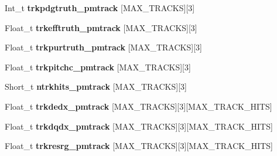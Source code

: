 \begin{DoxyCompactItemize}
\item 
\hypertarget{classanatree_a4039f571e1c27da177332399f30633b5}{Int\-\_\-t {\bfseries trkpdgtruth\-\_\-pmtrack} \mbox{[}M\-A\-X\-\_\-\-T\-R\-A\-C\-K\-S\mbox{]}\mbox{[}3\mbox{]}}\label{classanatree_a4039f571e1c27da177332399f30633b5}

\item 
\hypertarget{classanatree_a99202f1b486359afbf859093f5ac605e}{Float\-\_\-t {\bfseries trkefftruth\-\_\-pmtrack} \mbox{[}M\-A\-X\-\_\-\-T\-R\-A\-C\-K\-S\mbox{]}\mbox{[}3\mbox{]}}\label{classanatree_a99202f1b486359afbf859093f5ac605e}

\item 
\hypertarget{classanatree_a47b12693af49f90dada374e0d0f9105f}{Float\-\_\-t {\bfseries trkpurtruth\-\_\-pmtrack} \mbox{[}M\-A\-X\-\_\-\-T\-R\-A\-C\-K\-S\mbox{]}\mbox{[}3\mbox{]}}\label{classanatree_a47b12693af49f90dada374e0d0f9105f}

\item 
\hypertarget{classanatree_aa842f0282de766208616772211b5e34f}{Float\-\_\-t {\bfseries trkpitchc\-\_\-pmtrack} \mbox{[}M\-A\-X\-\_\-\-T\-R\-A\-C\-K\-S\mbox{]}\mbox{[}3\mbox{]}}\label{classanatree_aa842f0282de766208616772211b5e34f}

\item 
\hypertarget{classanatree_ae637a1305dfcb662e4696778c24e6972}{Short\-\_\-t {\bfseries ntrkhits\-\_\-pmtrack} \mbox{[}M\-A\-X\-\_\-\-T\-R\-A\-C\-K\-S\mbox{]}\mbox{[}3\mbox{]}}\label{classanatree_ae637a1305dfcb662e4696778c24e6972}

\item 
\hypertarget{classanatree_ad7277a76b6bcb971d0a96943117954d6}{Float\-\_\-t {\bfseries trkdedx\-\_\-pmtrack} \mbox{[}M\-A\-X\-\_\-\-T\-R\-A\-C\-K\-S\mbox{]}\mbox{[}3\mbox{]}\mbox{[}M\-A\-X\-\_\-\-T\-R\-A\-C\-K\-\_\-\-H\-I\-T\-S\mbox{]}}\label{classanatree_ad7277a76b6bcb971d0a96943117954d6}

\item 
\hypertarget{classanatree_a58473ac725f05967148c689020e3d771}{Float\-\_\-t {\bfseries trkdqdx\-\_\-pmtrack} \mbox{[}M\-A\-X\-\_\-\-T\-R\-A\-C\-K\-S\mbox{]}\mbox{[}3\mbox{]}\mbox{[}M\-A\-X\-\_\-\-T\-R\-A\-C\-K\-\_\-\-H\-I\-T\-S\mbox{]}}\label{classanatree_a58473ac725f05967148c689020e3d771}

\item 
\hypertarget{classanatree_a85f1b778c6742491c6c574120586bef3}{Float\-\_\-t {\bfseries trkresrg\-\_\-pmtrack} \mbox{[}M\-A\-X\-\_\-\-T\-R\-A\-C\-K\-S\mbox{]}\mbox{[}3\mbox{]}\mbox{[}M\-A\-X\-\_\-\-T\-R\-A\-C\-K\-\_\-\-H\-I\-T\-S\mbox{]}}\label{classanatree_a85f1b778c6742491c6c574120586bef3}


\end{DoxyCompactItemize}
